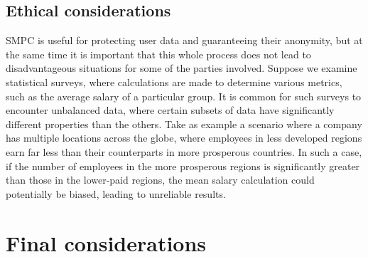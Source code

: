 \documentclass[12pt]{article}
\begin{document}
\subsection{Ethical considerations}
SMPC is useful for protecting user data and guaranteeing their anonymity, but at the same time it is important that this whole process does not lead to disadvantageous situations for some of the parties involved. Suppose we examine statistical surveys, where calculations are made to determine various metrics, such as the average salary of a particular group. It is common for such surveys to encounter unbalanced data, where certain subsets of data have significantly different properties than the others. Take as example a scenario where a company has multiple locations across the globe, where employees in less developed regions earn far less than their counterparts in more prosperous countries. In such a case, if the number of employees in the more prosperous regions is significantly greater than those in the lower-paid regions, the mean salary calculation could potentially be biased, leading to unreliable results.
\section{Final considerations}


\end{document}
